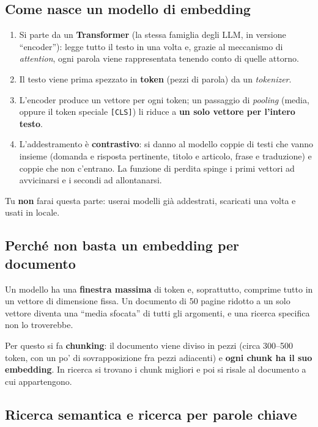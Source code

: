 \documentclass[11pt,a4paper]{article}
\newcommand{\code}[1]{\texttt{\small #1}}
\begin{document}
\subsection{Come nasce un modello di embedding}

\begin{enumerate}
  \item Si parte da un \textbf{Transformer} (la stessa famiglia degli LLM, in versione ``encoder''): legge tutto il testo in una volta e, grazie al meccanismo di \emph{attention}, ogni parola viene rappresentata tenendo conto di quelle attorno.
  \item Il testo viene prima spezzato in \textbf{token} (pezzi di parola) da un \emph{tokenizer}.
  \item L'encoder produce un vettore per ogni token; un passaggio di \emph{pooling} (media, oppure il token speciale \code{[CLS]}) li riduce a \textbf{un solo vettore per l'intero testo}.
  \item L'addestramento è \textbf{contrastivo}: si danno al modello coppie di testi che vanno insieme (domanda e risposta pertinente, titolo e articolo, frase e traduzione) e coppie che non c'entrano. La funzione di perdita spinge i primi vettori ad avvicinarsi e i secondi ad allontanarsi.
\end{enumerate}

Tu \textbf{non} farai questa parte: userai modelli già addestrati, scaricati una volta e usati in locale.

\subsection{Perché non basta un embedding per documento}

Un modello ha una \textbf{finestra massima} di token e, soprattutto, comprime tutto in un vettore di dimensione fissa. Un documento di 50 pagine ridotto a un solo vettore diventa una ``media sfocata'' di tutti gli argomenti, e una ricerca specifica non lo troverebbe.

Per questo si fa \textbf{chunking}: il documento viene diviso in pezzi (circa 300--500 token, con un po' di sovrapposizione fra pezzi adiacenti) e \textbf{ogni chunk ha il suo embedding}. In ricerca si trovano i chunk migliori e poi si risale al documento a cui appartengono.

\subsection{Ricerca semantica e ricerca per parole chiave}
\end{document}
